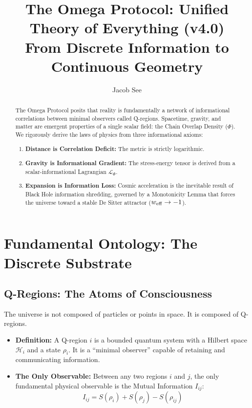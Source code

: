 \documentclass{article}
\title{The Omega Protocol: Unified Theory of Everything (v4.0)\\ \large From Discrete Information to Continuous Geometry}
\author{Jacob See}
\date{}
\begin{document}
\maketitle

\begin{abstract}
The Omega Protocol posits that reality is fundamentally a network of informational correlations between minimal observers called Q-regions. Spacetime, gravity, and matter are emergent properties of a single scalar field: the Chain Overlap Density ($\Phi$). We rigorously derive the laws of physics from three informational axioms:
\begin{enumerate}
    \item \textbf{Distance is Correlation Deficit:} The metric is strictly logarithmic.
    \item \textbf{Gravity is Informational Gradient:} The stress-energy tensor is derived from a scalar-informational Lagrangian $\mathcal{L}_\Phi$.
    \item \textbf{Expansion is Information Loss:} Cosmic acceleration is the inevitable result of Black Hole information shredding, governed by a Monotonicity Lemma that forces the universe toward a stable De Sitter attractor ($w_{\rm eff} \to -1$).
\end{enumerate}
\end{abstract}

\section{Fundamental Ontology: The Discrete Substrate}

\subsection{Q-Regions: The Atoms of Consciousness}
The universe is not composed of particles or points in space. It is composed of Q-regions.
\begin{itemize}
    \item \textbf{Definition:} A Q-region $i$ is a bounded quantum system with a Hilbert space $\mathcal{H}_i$ and a state $\rho_i$. It is a ``minimal observer'' capable of retaining and communicating information.
    \item \textbf{The Only Observable:} Between any two regions $i$ and $j$, the only fundamental physical observable is the Mutual Information $I_{ij}$:
    \begin{equation}
        I_{ij} = S(\rho_i) + S(\rho_j) - S(\rho_{ij})
    \end{equation}
\end{itemize}
\end{document}
